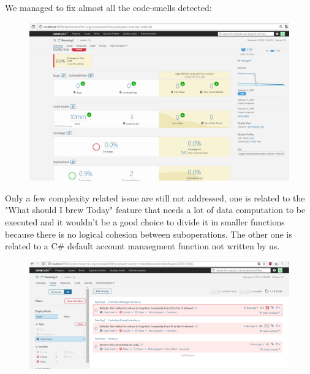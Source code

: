 \documentclass[12pt]{article}
\begin{document}
We managed to fix almost all the code-smells detected:
\begin{figure}[H]
\includegraphics[scale=0.5]{sonar4.png}
\end{figure}
Only a few complexity related issue are still not addressed, one is related to the "What should I brew Today" feature that needs
a lot of data computation to be executed and it wouldn't be a good choice to divide it in smaller functions because
there is no logical cohesion between suboperations. The other one is related to a C\# default account manaegment function not written by us.
\begin{figure}[H]
\includegraphics[scale=0.5]{code-smell.png}
\end{figure}
\end{document}
